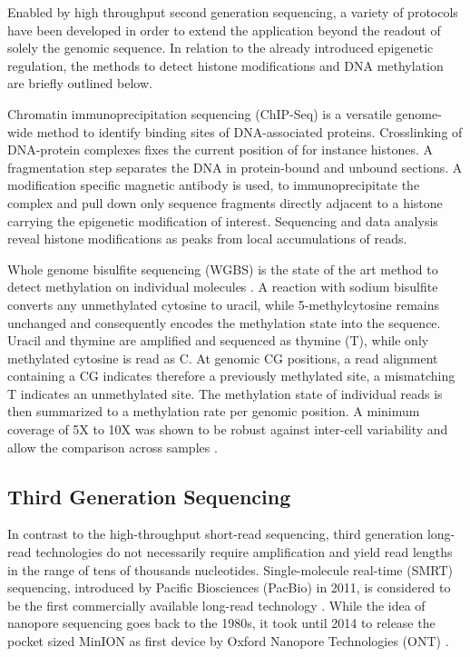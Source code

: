 Enabled by high throughput second generation sequencing, a variety of protocols have been developed in order to extend the application beyond the readout of solely the genomic sequence.
In relation to the already introduced epigenetic regulation, the methods to detect histone modifications and DNA methylation are briefly outlined below.

Chromatin immunoprecipitation sequencing (ChIP-Seq) is a versatile genome-wide method to identify binding sites of DNA-associated proteins.
Crosslinking of DNA-protein complexes fixes the current position of for instance histones. 
A fragmentation step separates the DNA in protein-bound and unbound sections.
A modification specific magnetic antibody is used, to immunoprecipitate the complex and pull down only sequence fragments directly adjacent to a histone carrying the epigenetic modification of interest.
Sequencing and data analysis reveal histone modifications as peaks from local accumulations of reads.

Whole genome bisulfite sequencing (WGBS) is the state of the art method to detect methylation on individual molecules \cite{Frommer1992}.
A reaction with sodium bisulfite converts any unmethylated cytosine to uracil, while 5-methylcytosine remains unchanged and consequently encodes the methylation state into the sequence. 
Uracil and thymine are amplified and sequenced as thymine (T), while only methylated cytosine is read as C.
At genomic CG positions, a read alignment containing a CG indicates therefore a previously methylated site, a mismatching T indicates an unmethylated site.
The methylation state of individual reads is then summarized to a methylation rate per genomic position.
A minimum coverage of 5X to 10X was shown to be robust against inter-cell variability and allow the comparison across samples \cite{Ziller2015}.




\subsection{Third Generation Sequencing}
\label{subsec:intro:tgs}

In contrast to the high-throughput short-read sequencing, third generation long-read technologies do not necessarily require amplification and yield read lengths in the range of tens of thousands nucleotides. 
Single-molecule real-time (SMRT) sequencing, introduced by Pacific Biosciences (PacBio) in 2011, is considered to be the first commercially available long-read technology \cite{Dijk2018}.
While the idea of nanopore sequencing goes back to the 1980s, it took until 2014 to release the pocket sized MinION as first device by Oxford Nanopore Technologies (ONT) \cite{Deamer2016}.

